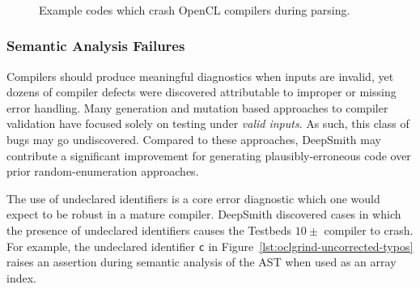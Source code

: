 \begin{figure}
  \centering %
  \\%
  \\%
  \\%
  \caption[Example codes which crash parsers]{%
    Example codes which crash OpenCL compilers during parsing.%
  }%
  \label{lst:parser-crashes}
\end{figure}

\subsubsection{Semantic Analysis Failures}

Compilers should produce meaningful diagnostics when inputs are invalid, yet dozens of compiler defects were discovered attributable to improper or missing error handling. Many generation and mutation based approaches to compiler validation have focused solely on testing under \emph{valid inputs}. As such, this class of bugs may go undiscovered. Compared to these approaches, DeepSmith may contribute a significant improvement for generating plausibly-erroneous code over prior random-enumeration approaches.

The use of undeclared identifiers is a core error diagnostic which one would expect to be robust in a mature compiler. DeepSmith discovered cases in which the presence of undeclared identifiers causes the Testbeds $10\pm$ compiler to crash. For example, the undeclared identifier \texttt{c} in Figure~\ref{lst:oclgrind-uncorrected-typos} raises an assertion during semantic analysis of the AST when used as an array index.

